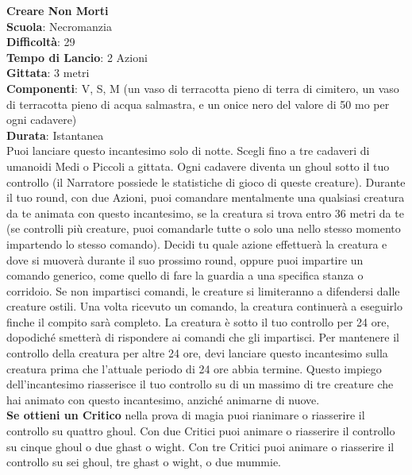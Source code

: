 \begin{multicols}{2}
\medskip\textbf{Creare Non Morti}\\
\textbf{Scuola}: Necromanzia\\
\textbf{Difficoltà}: 29\\
\textbf{Tempo di Lancio}: 2 Azioni\\
\textbf{Gittata}: 3 metri\\
\textbf{Componenti}: V, S, M (un vaso di terracotta pieno di terra di cimitero, un vaso di terracotta pieno di acqua salmastra, e un onice nero del valore di 50 mo per ogni cadavere)\\
\textbf{Durata}: Istantanea\\
Puoi lanciare questo incantesimo solo di notte. Scegli fino a tre cadaveri di umanoidi Medi o Piccoli a gittata. Ogni cadavere diventa un ghoul sotto il tuo controllo (il Narratore possiede le statistiche di gioco di queste creature). Durante il tuo round, con due Azioni, puoi comandare mentalmente una qualsiasi creatura da te animata con questo incantesimo, se la creatura si trova entro 36 metri da te (se controlli più creature, puoi comandarle tutte o solo una nello stesso momento impartendo lo stesso comando). Decidi tu quale azione effettuerà la creatura e dove si muoverà durante il suo prossimo round, oppure puoi impartire un comando generico, come quello di fare la guardia a una specifica stanza o corridoio. Se non impartisci comandi, le creature si limiteranno a difendersi dalle creature ostili. Una volta ricevuto un comando, la creatura continuerà a eseguirlo finche il compito sarà completo. La creatura è sotto il tuo controllo per 24 ore, dopodiché smetterà di rispondere ai comandi che gli impartisci. Per mantenere il controllo della creatura per altre 24 ore, devi lanciare questo incantesimo sulla creatura prima che l'attuale periodo di 24 ore abbia termine. Questo impiego dell'incantesimo riasserisce il tuo controllo su di un massimo di tre creature che hai animato con questo incantesimo, anziché animarne di nuove.\\
\textbf{Se ottieni un Critico} nella prova di magia puoi rianimare o riasserire il controllo su quattro ghoul. Con due Critici puoi animare o riasserire il controllo su cinque
ghoul o due ghast o wight. Con tre Critici puoi animare o riasserire il controllo su sei ghoul, tre ghast o wight, o due mummie. 


\end{multicols}
